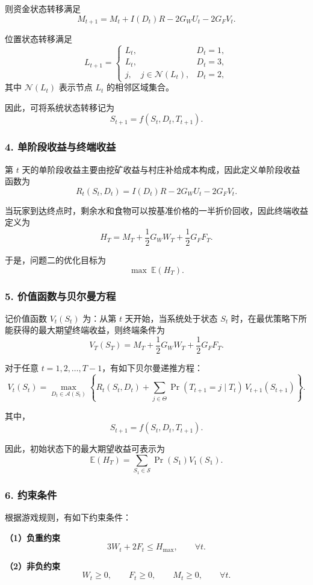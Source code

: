\documentclass[UTF8,a4paper,12pt]{ctexart}
\begin{document}
则资金状态转移满足
\[
M_{t+1}=M_t+I(D_t)R-2G_WU_t-2G_FV_t.
\]

位置状态转移满足
\[
L_{t+1}=
\begin{cases}
L_t, & D_t=1,\\
L_t, & D_t=3,\\
j,\quad j\in \mathcal{N}(L_t), & D_t=2,
\end{cases}
\]
其中 $\mathcal{N}(L_t)$ 表示节点 $L_t$ 的相邻区域集合。

因此，可将系统状态转移记为
\[
S_{t+1}=f(S_t,D_t,T_{t+1}).
\]

\subsubsection*{4. 单阶段收益与终端收益}

第 $t$ 天的单阶段收益主要由挖矿收益与村庄补给成本构成，因此定义单阶段收益函数为
\[
R_t(S_t,D_t)=I(D_t)R-2G_WU_t-2G_FV_t.
\]

当玩家到达终点时，剩余水和食物可以按基准价格的一半折价回收，因此终端收益定义为
\[
H_T=M_T+\frac{1}{2}G_WW_T+\frac{1}{2}G_FF_T.
\]

于是，问题二的优化目标为
\[
\max\ \mathbb{E}(H_T).
\]

\subsubsection*{5. 价值函数与贝尔曼方程}

记价值函数 $V_t(S_t)$ 为：从第 $t$ 天开始，当系统处于状态 $S_t$ 时，在最优策略下所能获得的最大期望终端收益，则终端条件为
\[
V_T(S_T)=M_T+\frac{1}{2}G_WW_T+\frac{1}{2}G_FF_T.
\]

对于任意 $t=1,2,\dots,T-1$，有如下贝尔曼递推方程：
\[
V_t(S_t)
=
\max_{D_t\in\mathcal{A}(S_t)}
\left\{
R_t(S_t,D_t)
+\sum_{j\in\Theta}\Pr(T_{t+1}=j\mid T_t)\,V_{t+1}(S_{t+1})
\right\}.
\]

其中，
\[
S_{t+1}=f(S_t,D_t,T_{t+1}).
\]

因此，初始状态下的最大期望收益可表示为
\[
\mathbb{E}(H_T)=\sum_{S_1\in\mathcal{S}}\Pr(S_1)V_1(S_1).
\]

\subsubsection*{6. 约束条件}

根据游戏规则，有如下约束条件：

\textbf{（1）负重约束}
\[
3W_t+2F_t\le H_{\max},\qquad \forall t.
\]

\textbf{（2）非负约束}
\[
W_t\ge 0,\qquad F_t\ge 0,\qquad M_t\ge 0,\qquad \forall t.
\]
\end{document}
